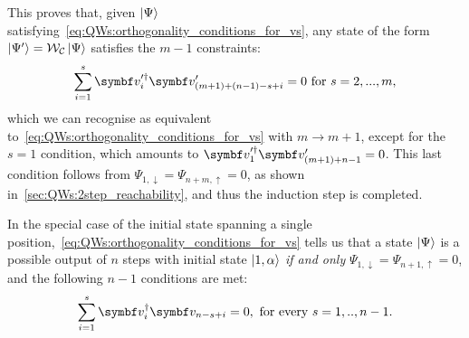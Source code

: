 This proves that, given $\ket\Psi$ satisfying~\cref{eq:QWs:orthogonality_conditions_for_vs}, any state of the form $\ket{\Psi'}={\mathcal{W}}_{\mathcal{C}}\ket\Psi$ satisfies the $m-1$ constraints:
\begin{equation}
    \sum_{i=1}^{s} \bs v^{\prime\dagger}_i \bs v^\prime_{(m+1)+(n-1)-s+i}=0
	\text{ for }
	s = 2,...,m,
	\label{eq:QWs:general_orthogonality_almost_finished}
\end{equation}
which we can recognise as equivalent to~\cref{eq:QWs:orthogonality_conditions_for_vs} with $m\to m+1$, except for the $s=1$ condition, which amounts to $\bs v_1^{\prime\dagger}\bs v'_{(m+1)+n-1}=0$.
This last condition follows from $\Psi_{1,\downarrow}=\Psi_{n+m,\uparrow}=0$, as shown in~\cref{sec:QWs:2step_reachability}, and thus the induction step is completed.

In the special case of the initial state spanning a single position,~\cref{eq:QWs:orthogonality_conditions_for_vs} tells us that a state $\ket{\Psi}$ is a possible output of $n$ steps with initial state $\ket{1,\alpha}$ \textit{if and only} $\Psi_{1,\downarrow}=\Psi_{n+1,\uparrow}=0$, and the following $n-1$ conditions are met:
\begin{equation}
    \sum_{i=1}^s \bs v_i^{\dagger} \bs v_{n-s+i} = 0,
    \text{ for every } s=1,..,n-1.
    \label{eq:QWs:general_reachability_conditions}
\end{equation}

